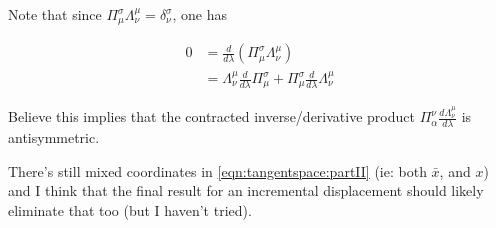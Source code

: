 Note that since $\Pi^\sigma_\mu \Lambda^\mu_\nu = \delta^\sigma_\nu$, one has

\begin{align*}
0 
&= \frac{d}{d\lambda} \left( \Pi^\sigma_\mu \Lambda^\mu_\nu \right) \\
&= \Lambda^\mu_\nu \frac{d}{d\lambda} \Pi^\sigma_\mu + \Pi^\sigma_\mu \frac{d}{d\lambda} \Lambda^\mu_\nu 
\end{align*}

Believe this implies that the contracted inverse/derivative product $\Pi^\nu_\alpha \frac{d \Lambda^\mu_\nu}{d\lambda}$ is antisymmetric.

There's still mixed coordinates in \ref{eqn:tangentspace:partII} (ie: both $\bar{x}$, and $x$) and I think that the final result for an incremental displacement
should likely eliminate that too (but I haven't tried).

%

%
%

%
